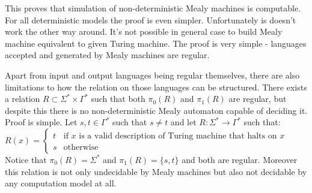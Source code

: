 \documentclass[12pt]{article}
\begin{document}
This proves that simulation of non-deterministic Mealy machines is computable. For all deterministic models the proof is even simpler. Unfortunately is doesn't work the other way around. It's not possible in general case to build Mealy machine equivalent to given Turing machine. The proof is very simple - languages accepted and generated by Mealy machines are regular. 

Apart from input and output languages being regular themselves, there are also limitations to how the relation on those languages can be structured. There exists a relation $ R \subset \Sigma^* \times \Gamma^*$
such that both $\pi_0(R)$ and $\pi_1(R)$ are regular, but despite this there is no non-deterministic Mealy automaton capable of deciding it. Proof is simple. Let $s,t\in \Gamma^*$ such that $s\ne t$ and let $R:\Sigma^* \rightarrow \Gamma^*$ such that: \\
$R(x) = \begin{cases}
t & \mbox{if }  x  \mbox{ is a valid description of Turing machine that halts on } x   \\
s & \mbox{otherwise} 
\end{cases}$ \\
Notice that $\pi_0(R) = \Sigma^*$ and $\pi_1(R) = \{s,t\}$ and both are regular. Moreover this relation is not only undecidable by Mealy machines but also not decidable by any computation model at all.
\end{document}
